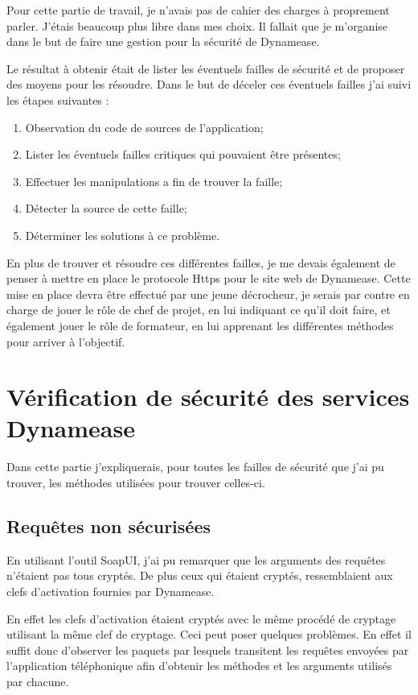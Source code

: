 Pour cette partie de travail, je n'avais pas de cahier des charges à proprement parler. J'étais beaucoup plus libre dans mes choix. Il fallait que je m'organise dans le but de faire une gestion pour la sécurité de Dynamease. 

Le résultat à obtenir était de lister les éventuels failles de sécurité et de proposer des moyens pour les résoudre. Dans le but de déceler ces éventuels failles j'ai suivi les étapes suivantes :

\begin{enumerate}
	\item Observation du code de sources de l'application;
	\item Lister les éventuels failles critiques qui pouvaient être présentes;
	\item Effectuer les manipulations a fin de trouver la faille;
	\item Détecter la source de cette faille;
	\item Déterminer les solutions à ce problème.
\end{enumerate} 

En plus de trouver et résoudre ces différentes failles, je me devais également de penser à mettre en place le protocole Https pour le site web de Dynamease. Cette mise en place devra être effectué par une jeune décrocheur, je serais par contre en charge de jouer le rôle de chef de projet, en lui indiquant ce qu'il doit faire, et également jouer le rôle de formateur, en lui apprenant les différentes méthodes pour arriver à l'objectif. 

\section{Vérification de sécurité des services Dynamease}

Dans cette partie j'expliquerais, pour toutes les failles de sécurité que j'ai pu trouver, les méthodes utilisées pour trouver celles-ci.

\subsection{Requêtes non sécurisées}

En utilisant l'outil SoapUI, j'ai pu remarquer que les arguments des requêtes n'étaient pas tous cryptés. De plus ceux qui étaient cryptés, ressemblaient aux clefs d'activation fournies par Dynamease.

En effet les clefs d'activation étaient cryptés avec le même procédé de cryptage utilisant la même clef de cryptage. Ceci peut poser quelques problèmes. En effet il suffit donc d'observer les paquets par lesquels transitent les requêtes envoyées par l'application téléphonique afin d'obtenir les méthodes et les arguments utilisés par chacune.

